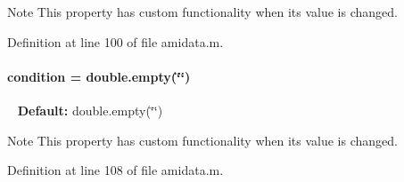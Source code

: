 \begin{DoxyNote}{Note}
This property has custom functionality when its value is changed. 
\end{DoxyNote}


Definition at line 100 of file amidata.\+m.

\hypertarget{classamidata_a4824b91cc0e6b5f112bdd8049af4d7d6}{}
\paragraph[{condition}]{\setlength{\rightskip}{0pt plus 5cm}condition = double.\+empty(\char`\"{}\char`\"{})}\label{classamidata_a4824b91cc0e6b5f112bdd8049af4d7d6}
~\newline
{\bfseries Default\+:} double.\+empty(\char`\"{}\char`\"{})

\begin{DoxyNote}{Note}
This property has custom functionality when its value is changed. 
\end{DoxyNote}


Definition at line 108 of file amidata.\+m.

